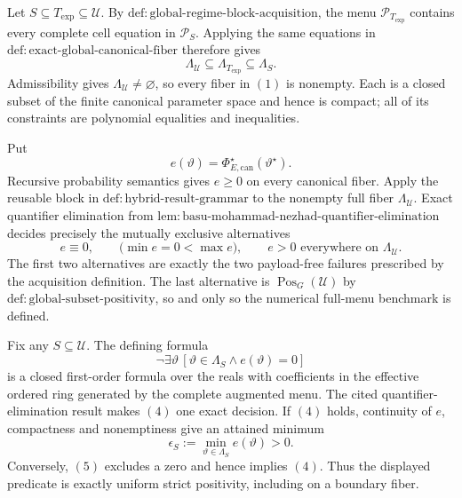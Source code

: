 Let \(S\subseteq T_{\mathrm{exp}}\subseteq\mathcal U\).  By
\(\mathrm{def:global\text{-}regime\text{-}block\text{-}acquisition}\), the menu
\(\mathcal P_{T_{\mathrm{exp}}}\) contains every complete cell equation in
\(\mathcal P_S\).  Applying the same equations in
\(\mathrm{def:exact\text{-}global\text{-}canonical\text{-}fiber}\) therefore gives
\[
\Lambda_{\mathcal U}\subseteq
\Lambda_{T_{\mathrm{exp}}}\subseteq\Lambda_S.
\tag{1}
\]
Admissibility gives \(\Lambda_{\mathcal U}\ne\varnothing\), so every fiber in
\((1)\) is nonempty.  Each is a closed subset of the finite canonical parameter
space and hence is compact; all of its constraints are polynomial equalities and
inequalities.

Put
\[
e(\vartheta)=
\Phi_{E,\mathrm{can}}^\star(\vartheta^\star).
\tag{2}
\]
Recursive probability semantics gives \(e\geq0\) on every canonical fiber.  Apply
the reusable block in \(\mathrm{def:hybrid\text{-}result\text{-}grammar}\) to the
nonempty full fiber \(\Lambda_{\mathcal U}\).  Exact quantifier elimination from
\(\mathrm{lem:basu\text{-}mohammad\text{-}nezhad\text{-}quantifier\text{-}elimination}\)
decides precisely the mutually exclusive alternatives
\[
 e\equiv0,
\qquad
\bigl(\min e=0<\max e\bigr),
\qquad
e>0\text{ everywhere on }\Lambda_{\mathcal U}.
\tag{3}
\]
The first two alternatives are exactly the two payload-free failures prescribed by
the acquisition definition.  The last alternative is
\(\operatorname{Pos}_G(\mathcal U)\) by
\(\mathrm{def:global\text{-}subset\text{-}positivity}\), so and only so the numerical
full-menu benchmark is defined.

Fix any \(S\subseteq\mathcal U\).  The defining formula
\[
\neg\exists\vartheta\,
\left[\vartheta\in\Lambda_S\wedge e(\vartheta)=0\right]
\tag{4}
\]
is a closed first-order formula over the reals with coefficients in the effective
ordered ring generated by the complete augmented menu.  The cited
quantifier-elimination result makes \((4)\) one exact decision.  If \((4)\) holds,
continuity of \(e\), compactness and nonemptiness give an attained minimum
\[
\epsilon_S:=\min_{\vartheta\in\Lambda_S}e(\vartheta)>0.
\tag{5}
\]
Conversely, \((5)\) excludes a zero and hence implies \((4)\).  Thus the displayed
predicate is exactly uniform strict positivity, including on a boundary fiber.


